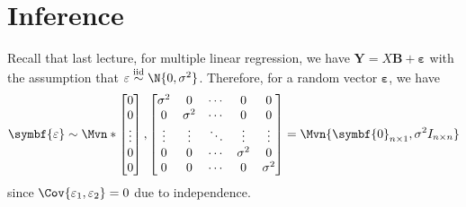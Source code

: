 \section{Inference}
Recall that last lecture, for multiple linear regression,
we have $ \symbf{Y}=X\symbf{B}+\symbf{\varepsilon} $
with the assumption that $ \varepsilon\stackrel{\text{iid}}{\sim}\N{0,\sigma^2} $.
Therefore, for a random vector $ \symbf{\varepsilon} $, we have
\[ \symbf{\varepsilon}\sim\Mvn*{
    \begin{bmatrix}
      0      \\
      0      \\
      \vdots \\
      0      \\
      0
    \end{bmatrix},
    \begin{bmatrix}
      \sigma^2 & 0        & \cdots & 0        & 0        \\
      0        & \sigma^2 & \cdots & 0        & 0        \\
      \vdots   & \vdots   & \ddots & \vdots   & \vdots   \\
      0        & 0        & \cdots & \sigma^2 & 0        \\
      0        & 0        & \cdots & 0        & \sigma^2 \\
    \end{bmatrix}}=
  \Mvn{\symbf{0}_{n\times 1},\sigma^2I_{n\times n}} \]
since $ \Cov{\varepsilon_1,\varepsilon_2}=0 $ due to independence.

